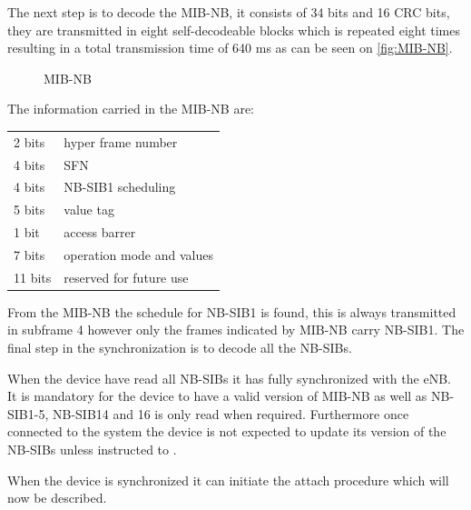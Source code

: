 The next step is to decode the \gls{MIB-NB}, it consists of 34 bits and 16 \gls{CRC} bits, they are transmitted in eight self-decodeable blocks which is repeated eight times resulting in a total transmission time of 640 ms as can be seen on \autoref{fig:MIB-NB}. 
 
\begin{figure}[H]
\centering

\caption{MIB-NB}
\label{fig:MIB-NB}
\end{figure}

The information carried in the \gls{MIB-NB} are:

\begin{tabular}{ll}\\
2 bits & hyper frame number\\
4 bits & \gls{SFN}\\
4 bits & \gls{NB-SIB}1 scheduling\\
5 bits & value tag\\
1 bit & access barrer\\
7 bits & operation mode and values\\
11 bits & reserved for future use\\
\end{tabular}

From the \gls{MIB-NB} the schedule for \gls{NB-SIB}1 is found, this is always transmitted in subframe 4 however only the frames indicated by \gls{MIB-NB} carry \gls{NB-SIB}1. The final step in the synchronization is to decode all the \gls{NB-SIB}s.

When the device have read all \gls{NB-SIB}s it has fully synchronized with the \gls{eNB}. It is mandatory for the device to have a valid version of \gls{MIB-NB} as well as \gls{NB-SIB}1-5, \gls{NB-SIB}14 and 16 is only read when required. Furthermore once connected to the system the device is not expected to update its version of the \gls{NB-SIB}s unless instructed to \citep{whitepaper}. 

When the device is synchronized it can initiate the attach procedure which will now be described. 




